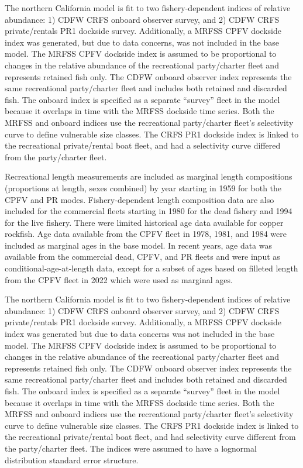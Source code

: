 \documentclass[11pt,
  letterpaper,
]{article}
\begin{document}
The northern California model is fit to two fishery-dependent indices of relative abundance: 1) CDFW CRFS onboard observer survey, and 2) CDFW CRFS private/rentals PR1 dockside survey. Additionally, a MRFSS CPFV dockside index was generated, but due to data concerns, was not included in the base model. The MRFSS CPFV dockside index is assumed to be proportional to changes in the relative abundance of the recreational party/charter fleet and represents retained fish only. The CDFW onboard observer index represents the same recreational party/charter fleet and includes both retained and discarded fish. The onboard index is specified as a separate ``survey'' fleet in the model because it overlaps in time with the MRFSS dockside time series. Both the MRFSS and onboard indices use the recreational party/charter fleet's selectivity curve to define vulnerable size classes. The CRFS PR1 dockside index is linked to the recreational private/rental boat fleet, and had a selectivity curve differed from the party/charter fleet.

Recreational length measurements are included as marginal length compositions (proportions at length, sexes combined) by year starting in 1959 for both the CPFV and PR modes. Fishery-dependent length composition data are also included for the commercial fleets starting in 1980 for the dead fishery and 1994 for the live fishery. There were limited historical age data available for copper rockfish. Age data available from the CPFV fleet in 1978, 1981, and 1984 were included as marginal ages in the base model. In recent years, age data was available from the commercial dead, CPFV, and PR fleets and were input as conditional-age-at-length data, except for a subset of ages based on filleted length from the CPFV fleet in 2022 which were used as marginal ages.

The northern California model is fit to two fishery-dependent indices of relative abundance: 1) CDFW CRFS onboard observer survey, and 2) CDFW CRFS private/rentals PR1 dockside survey. Additionally, a MRFSS CPFV dockside index was generated but due to data concerns was not included in the base model. The MRFSS CPFV dockside index is assumed to be proportional to changes in the relative abundance of the recreational party/charter fleet and represents retained fish only. The CDFW onboard observer index represents the same recreational party/charter fleet and includes both retained and discarded fish. The onboard index is specified as a separate ``survey'' fleet in the model because it overlaps in time with the MRFSS dockside time series. Both the MRFSS and onboard indices use the recreational party/charter fleet's selectivity curve to define vulnerable size classes. The CRFS PR1 dockside index is linked to the recreational private/rental boat fleet, and had selectivity curve different from the party/charter fleet. The indices were assumed to have a lognormal distribution standard error structure.
\end{document}
